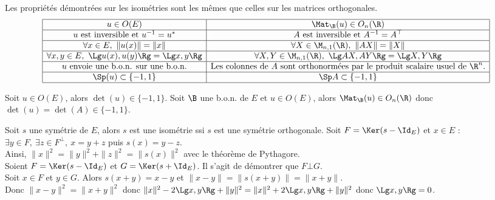 \documentclass[11pt]{article}
\begin{document}
\begin{rappel}{}{}
    Les propriétés démontrées sur les isométries sont les mêmes que celles sur les matrices orthogonales.
    \begin{equation*}
        \begin{array}{|c|c|}
            \hline
            u \in O(E) & \Mat_\B(u) \in O_n(\R)\\
            \hline
            u $ est inversible et $ u^{-1}=u^* & A $ est inversible et $ A^{-1} = A^\top\\
            \hline
            \forall x \in E, ~ \|u(x)\|=\|x\| & \forall X \in \M_{n,1}(\R), ~ \|AX\|=\|X\|\\
            \hline
            \forall x, y \in E, ~ \Lg u(x), u(y) \Rg = \Lg x,y\Rg & \forall X,Y \in \M_{n,1}(\R), ~ \Lg AX, AY \Rg = \Lg X,Y\Rg\\
            \hline
            u $ envoie une b.o.n. sur une b.o.n.$ & $Les colonnes de $ A $ sont orthonormées par le produit scalaire usuel de $ \R^n.\\
            \hline
            \Sp(u) \subset \{-1,1\} & \Sp A \subset \{-1,1\}\\
            \hline 
        \end{array}
    \end{equation*}
\end{rappel}

\begin{prop}{}{}
    Soit $u\in O(E)$, alors $\det(u)\in\{-1,1\}$.
    \tcblower
    Soit $\B$ une b.o.n. de $E$ et $u\in O(E)$, alors $\Mat_\B(u)\in O_n(\R)$ donc $\det(u)=\det(A)\in\{-1,1\}$.
\end{prop}

\begin{prop}{}{}
    Soit $s$ une symétrie de $E$, alors $s$ est une isométrie ssi $s$ est une symétrie orthogonale.
    \tcblower
    \boxed{\la} Soit $F=\Ker(s-\Id_E)$ et $x\in E$ : $\exists y\in F, ~ \exists z\in F^\bot, ~ x=y+z$ puis $s(x)=y-z$.\\
    Ainsi, $\|x\|^2=\|y\|^2+\|z\|^2=\|s(x)\|^2$ avec le théorème de Pythagore.\\
    \boxed{\ra} Soient $F=\Ker(s-\Id_E)$ et $G=\Ker(s+\Id_E)$. Il s'agit de démontrer que $F\bot G$.\\
    Soit $x\in F$ et $y\in G$. Alors $s(x+y)=x-y$ et $\|x-y\|=\|s(x+y)\|=\|x+y\|$.\\
    Donc $\|x-y\|^2=\|x+y\|^2$ donc $\|x\|^2-2\Lg x,y\Rg + \|y\|^2 = \|x\|^2 + 2\Lg x,y \Rg + \|y\|^2$ donc $\Lg x,y \Rg = 0$.
\end{prop}
\end{document}
